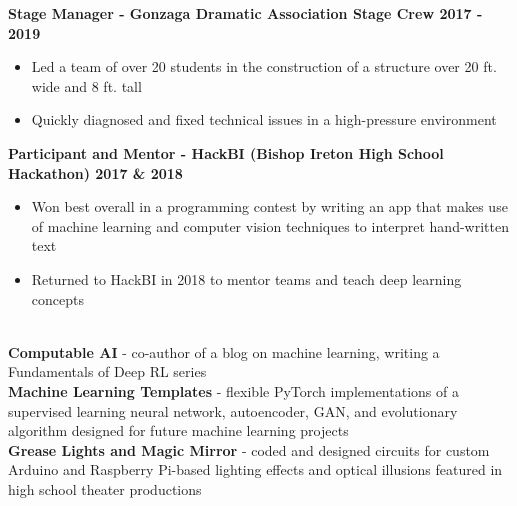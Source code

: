 \documentclass{article}
\begin{document}
\begin{center}
\begin{flushleft}
    \textbf{Stage Manager - Gonzaga Dramatic Association Stage Crew \hfill 2017 - 2019}
    \begin{itemize}
      \itemsep0em
      \item Led a team of over 20 students in the construction of a structure over 20 ft. wide and 8 ft. tall
      \item Quickly diagnosed and fixed technical issues in a high-pressure environment
    \end{itemize}

    \textbf{Participant and Mentor - HackBI  (Bishop Ireton High School Hackathon) \hfill 2017 \& 2018}
    \begin{itemize}
      \itemsep0em
      \item Won best overall in a programming contest by writing an app that makes use of machine learning and computer vision techniques to interpret hand-written text
      \item Returned to HackBI in 2018 to mentor teams and teach deep learning concepts
    \end{itemize}


    {\large\textbf{\underline{}}} \\
    \textbf{Computable AI} - co-author of a blog on machine learning, writing a Fundamentals of Deep RL series \\
    \textbf{Machine Learning Templates} - flexible PyTorch implementations of a supervised learning neural network, autoencoder, GAN, and evolutionary algorithm designed for future machine learning projects \\
    \textbf{Grease Lights and Magic Mirror} - coded and designed circuits for custom Arduino and Raspberry Pi-based lighting effects and optical illusions featured in high school theater productions

  \end{flushleft}
  \end{center}
\end{document}
